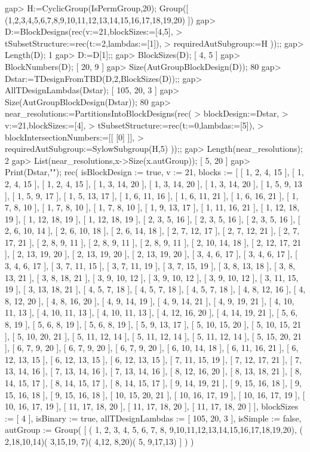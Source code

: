 \beginexample
gap> H:=CyclicGroup(IsPermGroup,20);
Group([ (1,2,3,4,5,6,7,8,9,10,11,12,13,14,15,16,17,18,19,20) ])
gap> D:=BlockDesigns(rec(v:=21,blockSizes:=[4,5],
>       tSubsetStructure:=rec(t:=2,lambdas:=[1]),
>       requiredAutSubgroup:=H ));;
gap> Length(D);
1
gap> D:=D[1];;
gap> BlockSizes(D);
[ 4, 5 ]
gap> BlockNumbers(D);
[ 20, 9 ]
gap> Size(AutGroupBlockDesign(D));
80
gap> Dstar:=TDesignFromTBD(D,2,BlockSizes(D));;
gap> AllTDesignLambdas(Dstar);
[ 105, 20, 3 ]
gap> Size(AutGroupBlockDesign(Dstar));
80
gap> near_resolutions:=PartitionsIntoBlockDesigns(rec(
>    blockDesign:=Dstar,
>    v:=21,blockSizes:=[4],
>    tSubsetStructure:=rec(t:=0,lambdas:=[5]),
>    blockIntersectionNumbers:=[[ [0] ]],
>    requiredAutSubgroup:=SylowSubgroup(H,5) ));;
gap> Length(near_resolutions);
2
gap> List(near_resolutions,x->Size(x.autGroup));
[ 5, 20 ]
gap> Print(Dstar,"\n");
rec(
  isBlockDesign := true,
  v := 21,
  blocks := [ [ 1, 2, 4, 15 ], [ 1, 2, 4, 15 ], [ 1, 2, 4, 15 ], 
      [ 1, 3, 14, 20 ], [ 1, 3, 14, 20 ], [ 1, 3, 14, 20 ], [ 1, 5, 9, 13 ], 
      [ 1, 5, 9, 17 ], [ 1, 5, 13, 17 ], [ 1, 6, 11, 16 ], [ 1, 6, 11, 21 ], 
      [ 1, 6, 16, 21 ], [ 1, 7, 8, 10 ], [ 1, 7, 8, 10 ], [ 1, 7, 8, 10 ], 
      [ 1, 9, 13, 17 ], [ 1, 11, 16, 21 ], [ 1, 12, 18, 19 ], 
      [ 1, 12, 18, 19 ], [ 1, 12, 18, 19 ], [ 2, 3, 5, 16 ], [ 2, 3, 5, 16 ], 
      [ 2, 3, 5, 16 ], [ 2, 6, 10, 14 ], [ 2, 6, 10, 18 ], [ 2, 6, 14, 18 ], 
      [ 2, 7, 12, 17 ], [ 2, 7, 12, 21 ], [ 2, 7, 17, 21 ], [ 2, 8, 9, 11 ], 
      [ 2, 8, 9, 11 ], [ 2, 8, 9, 11 ], [ 2, 10, 14, 18 ], [ 2, 12, 17, 21 ], 
      [ 2, 13, 19, 20 ], [ 2, 13, 19, 20 ], [ 2, 13, 19, 20 ], 
      [ 3, 4, 6, 17 ], [ 3, 4, 6, 17 ], [ 3, 4, 6, 17 ], [ 3, 7, 11, 15 ], 
      [ 3, 7, 11, 19 ], [ 3, 7, 15, 19 ], [ 3, 8, 13, 18 ], [ 3, 8, 13, 21 ], 
      [ 3, 8, 18, 21 ], [ 3, 9, 10, 12 ], [ 3, 9, 10, 12 ], [ 3, 9, 10, 12 ], 
      [ 3, 11, 15, 19 ], [ 3, 13, 18, 21 ], [ 4, 5, 7, 18 ], [ 4, 5, 7, 18 ], 
      [ 4, 5, 7, 18 ], [ 4, 8, 12, 16 ], [ 4, 8, 12, 20 ], [ 4, 8, 16, 20 ], 
      [ 4, 9, 14, 19 ], [ 4, 9, 14, 21 ], [ 4, 9, 19, 21 ], [ 4, 10, 11, 13 ],
      [ 4, 10, 11, 13 ], [ 4, 10, 11, 13 ], [ 4, 12, 16, 20 ], 
      [ 4, 14, 19, 21 ], [ 5, 6, 8, 19 ], [ 5, 6, 8, 19 ], [ 5, 6, 8, 19 ], 
      [ 5, 9, 13, 17 ], [ 5, 10, 15, 20 ], [ 5, 10, 15, 21 ], 
      [ 5, 10, 20, 21 ], [ 5, 11, 12, 14 ], [ 5, 11, 12, 14 ], 
      [ 5, 11, 12, 14 ], [ 5, 15, 20, 21 ], [ 6, 7, 9, 20 ], [ 6, 7, 9, 20 ], 
      [ 6, 7, 9, 20 ], [ 6, 10, 14, 18 ], [ 6, 11, 16, 21 ], 
      [ 6, 12, 13, 15 ], [ 6, 12, 13, 15 ], [ 6, 12, 13, 15 ], 
      [ 7, 11, 15, 19 ], [ 7, 12, 17, 21 ], [ 7, 13, 14, 16 ], 
      [ 7, 13, 14, 16 ], [ 7, 13, 14, 16 ], [ 8, 12, 16, 20 ], 
      [ 8, 13, 18, 21 ], [ 8, 14, 15, 17 ], [ 8, 14, 15, 17 ], 
      [ 8, 14, 15, 17 ], [ 9, 14, 19, 21 ], [ 9, 15, 16, 18 ], 
      [ 9, 15, 16, 18 ], [ 9, 15, 16, 18 ], [ 10, 15, 20, 21 ], 
      [ 10, 16, 17, 19 ], [ 10, 16, 17, 19 ], [ 10, 16, 17, 19 ], 
      [ 11, 17, 18, 20 ], [ 11, 17, 18, 20 ], [ 11, 17, 18, 20 ] ],
  blockSizes := [ 4 ],
  isBinary := true,
  allTDesignLambdas := [ 105, 20, 3 ],
  isSimple := false,
  autGroup := 
   Group( [ ( 1, 2, 3, 4, 5, 6, 7, 8, 9,10,11,12,13,14,15,16,17,18,19,20), 
      ( 2,18,10,14)( 3,15,19, 7)( 4,12, 8,20)( 5, 9,17,13) ] ) )
\endexample
